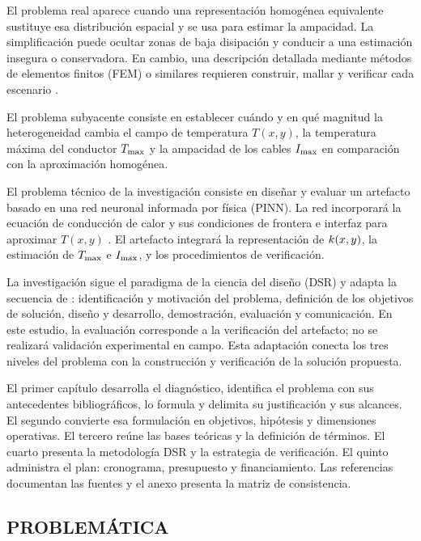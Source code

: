 El problema real aparece cuando una representación homogénea equivalente sustituye esa distribución espacial y se usa para estimar la ampacidad. La simplificación puede ocultar zonas de baja disipación y conducir a una estimación insegura o conservadora. En cambio, una descripción detallada mediante métodos de elementos finitos (FEM) o similares requieren construir, mallar y verificar cada escenario \parencites[41--42,93--99]{cigre2025}[1--3,12]{aldulaimi2024}.

El problema subyacente consiste en establecer cuándo y en qué magnitud la heterogeneidad cambia el campo de temperatura \(T(x,y)\), la temperatura máxima del conductor \(T_{\max}\) y la ampacidad de los cables \(I_{\max}\) en comparación con la aproximación homogénea.

El problema técnico de la investigación consiste en diseñar y evaluar un artefacto basado en una red neuronal informada por física (PINN). La red incorporará la ecuación de conducción de calor y sus condiciones de frontera e interfaz para aproximar \(T(x,y)\) \parencite{raissi2019}. El artefacto integrará la representación de \(k(x,y)\), la estimación de \(T_{\max}\) e \(I_{\max}\), y los procedimientos de verificación.

La investigación sigue el paradigma de la ciencia del diseño (DSR) y adapta la secuencia de \textcite[54--56]{peffers2007}: identificación y motivación del problema, definición de los objetivos de solución, diseño y desarrollo, demostración, evaluación y comunicación. En este estudio, la evaluación corresponde a la verificación del artefacto; no se realizará validación experimental en campo. Esta adaptación conecta los tres niveles del problema con la construcción y verificación de la solución propuesta.

El primer capítulo desarrolla el diagnóstico, identifica el problema con sus antecedentes bibliográficos, lo formula y delimita su justificación y sus alcances. El segundo convierte esa formulación en objetivos, hipótesis y dimensiones operativas. El tercero reúne las bases teóricas y la definición de términos. El cuarto presenta la metodología DSR y la estrategia de verificación. El quinto administra el plan: cronograma, presupuesto y financiamiento. Las referencias documentan las fuentes y el anexo presenta la matriz de consistencia.

\subsection{PROBLEMÁTICA}

